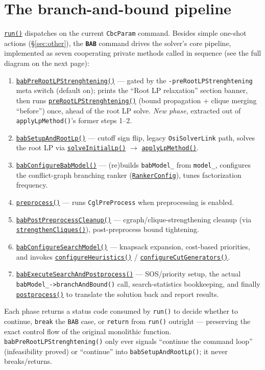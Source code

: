 \documentclass[10pt]{article}
\newcommand{\GHBASE}{https://github.com/coin-or/Cbc/blob/next/src}
\newcommand{\ghc}[2]{\href{\GHBASE/CbcSolver.cpp\#L#1}{#2}}
\newcommand{\ghh}[2]{\href{\GHBASE/CbcSolver.hpp\#L#1}{#2}}
\begin{document}
\section{The branch-and-bound pipeline}\label{sec:pipeline}
\ghc{10464}{\texttt{run()}} dispatches on the current \texttt{CbcParam} command. Besides simple one-shot actions
(\S\ref{sec:other}), the \textbf{\texttt{BAB}} command drives the solver's core pipeline, implemented as seven
cooperating private methods called in sequence (see the full diagram on the next page):
\begin{enumerate}[leftmargin=1.6em, itemsep=1pt]
  \item \ghc{7212}{\texttt{babPreRootLPStrenghtening()}} --- gated by the \texttt{-preRootLPStrenghtening} meta
    switch (default on); prints the ``Root LP relaxation'' section banner, then runs
    \ghc{1220}{\texttt{preRootLPStrenghtening()}} (bound propagation + clique merging ``before'') once, ahead of
    the root LP solve. \emph{New phase}, extracted out of \texttt{applyLpMethod()}'s former steps 1--2.
  \item \ghc{7248}{\texttt{babSetupAndRootLp()}} --- cutoff sign flip, legacy \texttt{OsiSolverLink} path,
    solves the root LP via \ghc{5620}{\texttt{solveInitialLp()}} $\to$ \ghc{1269}{\texttt{applyLpMethod()}}.
  \item \ghc{7598}{\texttt{babConfigureBabModel()}} --- (re)builds \texttt{babModel\_} from \texttt{model\_}, configures
    the conflict-graph branching ranker (\ghh{844}{\texttt{RankerConfig}}), tunes factorization frequency.
  \item \ghc{3651}{\texttt{preprocess()}} --- runs \texttt{CglPreProcess} when preprocessing is enabled.
  \item \ghc{7845}{\texttt{babPostPreprocessCleanup()}} --- cgraph/clique-strengthening cleanup (via
    \ghc{1198}{\texttt{strengthenCliques()}}), post-preprocess bound tightening.
  \item \ghc{7973}{\texttt{babConfigureSearchModel()}} --- knapsack expansion, cost-based priorities, and
    invokes \ghc{10438}{\texttt{configureHeuristics()}} / \ghc{10444}{\texttt{configureCutGenerators()}}.
  \item \ghc{8374}{\texttt{babExecuteSearchAndPostprocess()}} --- SOS/priority setup, the actual
    \texttt{babModel\_->branchAndBound()} call, search-statistics bookkeeping, and finally
    \ghc{4892}{\texttt{postprocess()}} to translate the solution back and report results.
\end{enumerate}
Each phase returns a status code consumed by \texttt{run()} to decide whether to continue, \texttt{break}
the \texttt{BAB} case, or \texttt{return} from \texttt{run()} outright --- preserving the exact control flow of the
original monolithic function. \texttt{babPreRootLPStrenghtening()} only ever signals ``continue the command
loop'' (infeasibility proved) or ``continue'' into \texttt{babSetupAndRootLp()}; it never breaks/returns.
\end{document}
